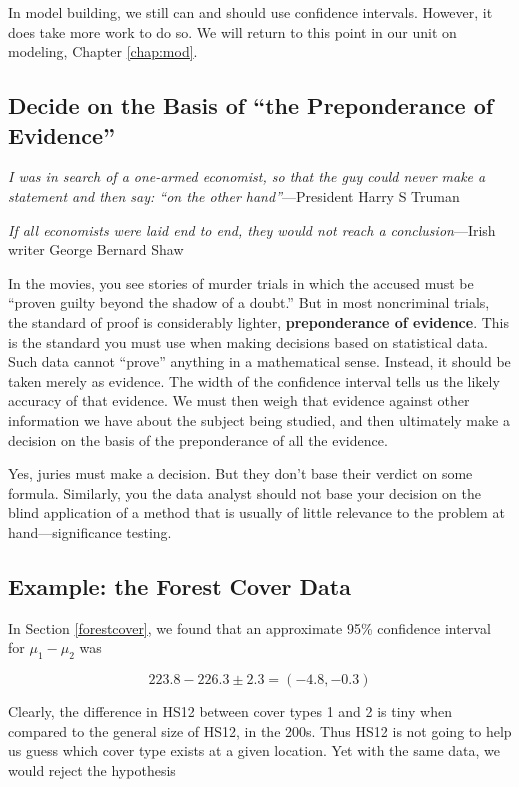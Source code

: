 In model building, we still can and should use confidence intervals.
However, it does take more work to do so.  We will return to this point
in our unit on modeling, Chapter \ref{chap:mod}.

\subsection{Decide on the Basis of ``the Preponderance of Evidence''}
\label{preponderance}

{\it I was in search of a one-armed economist, so that the guy could
never make a statement and then say: ``on the other hand''}---President
Harry S Truman

{\it If all economists were laid end to end, they would not reach a
conclusion}---Irish writer George Bernard Shaw

\bigskip

In the movies, you see stories of murder trials in which the accused
must be ``proven guilty beyond the shadow of a doubt.''  But in most
noncriminal trials, the standard of proof is considerably lighter, {\bf
preponderance of evidence}.  This is the standard you must use when
making decisions based on statistical data.  Such data cannot ``prove''
anything in a mathematical sense.  Instead, it should be taken merely as
evidence.  The width of the confidence interval tells us the likely
accuracy of that evidence.  We must then weigh that evidence against
other information we have about the subject being studied, and then
ultimately make a decision on the basis of the preponderance of all the
evidence.

Yes, juries must make a decision.  But they don't base their verdict on
some formula.  Similarly, you the data analyst should not base your
decision on the blind application of a method that is usually of little
relevance to the problem at hand---significance testing.

\subsection{Example:  the Forest Cover Data}

In Section \ref{forestcover}, we found that an approximate 95\%
confidence interval for $\mu_1 - \mu_2$ was

\begin{equation}
223.8 - 226.3 \pm 2.3
= (-4.8,-0.3)
\end{equation}

Clearly, the difference in HS12 between cover types 1 and 2 is tiny when
compared to the general size of HS12, in the 200s.  Thus HS12 is not
going to help us guess which cover type exists at a given location.  Yet
with the same data, we would reject the hypothesis

